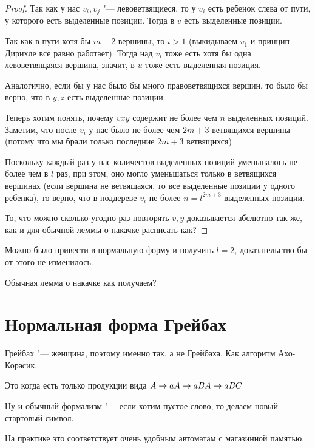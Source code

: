 \begin{proof}
Так как у нас $v_i, v_j$ "--- левоветвящиеся, то у $v_i$ есть ребенок слева от пути, у которого есть выделенные позиции. 
Тогда в $v$ есть выделенные позиции.

Так как в пути хотя бы $m + 2$ вершины, то $i > 1$ (выкидываем $v_1$ и принцип Дирихле все равно работает).
Тогда над $v_i$ тоже есть хотя бы одна левоветвящаяся вершина, значит, в $u$ тоже есть выделенная позиция.

Аналогично, если бы у нас было бы много правоветвящихся вершин, то было бы верно, что в $y, z$ есть выделенные позиции.

Теперь хотим понять, почему $vxy$ содержит не более чем $n$ выделенных позиций.
Заметим, что после $v_i$ у нас было не более чем $2m + 3$ ветвящихся вершины (потому что мы брали только последние $2m + 3$ ветвящихся)

Поскольку каждый раз у нас количестов выделенных позиций уменьшалось не более чем в $l$ раз, при этом, 
оно могло уменьшаться только в ветвящихся вершинах (если вершина не ветвящаяся, то все выделенные позиции у одного ребенка), то верно, что
в поддереве $v_i$ не более $n = l^{2m + 3}$ выделенных позиции.

То, что можно сколько угодно раз повторять $v, y$ доказывается абслютно так же, как и для обычной леммы о накачке \TODO расписать как?
\end{proof}
\begin{Rem}
Можно было привести в нормальную форму и получить $l = 2$, доказательство бы от этого не изменилось.
\end{Rem}
\begin{conseq}
Обычная лемма о накачке \TODO как получаем?
\end{conseq}

\section{Нормальная форма Грейбах}
\begin{Rem}
Грейбах "--- женщина, поэтому именно так, а не Грейбаха. 
Как алгоритм Ахо-Корасик.
\end{Rem}

Это когда есть только продукции вида $\\
A \to a \\
A \to aB \\
A \to aBC$

Ну и обычный формализм "--- если хотим пустое слово, то делаем новый стартовый символ.

На практике это соответствует очень удобным автоматам с магазинной памятью.

